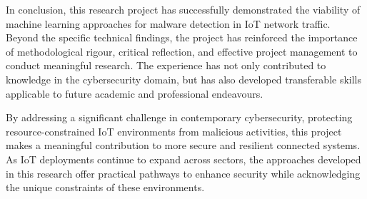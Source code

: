 In conclusion, this research project has successfully demonstrated the viability of machine learning approaches for malware detection in IoT network traffic. Beyond the specific technical findings, the project has reinforced the importance of methodological rigour, critical reflection, and effective project management to conduct meaningful research. The experience has not only contributed to knowledge in the cybersecurity domain, but has also developed transferable skills applicable to future academic and professional endeavours.

By addressing a significant challenge in contemporary cybersecurity, protecting resource-constrained IoT environments from malicious activities, this project makes a meaningful contribution to more secure and resilient connected systems. As IoT deployments continue to expand across sectors, the approaches developed in this research offer practical pathways to enhance security while acknowledging the unique constraints of these environments.